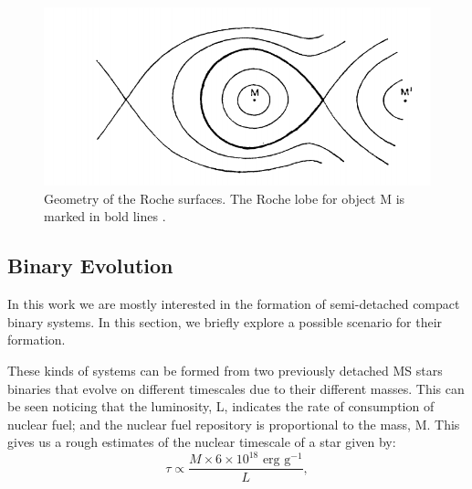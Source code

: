 \begin{figure}[]
        \centering
\includegraphics[scale=.3]{assets/images/kopalroche.png}
\caption[Geometry of the Roche surfaces]{Geometry of the Roche surfaces. The Roche lobe for object M is marked in bold lines \citep{kopal_close_1959}.}
\label{fig:roche1}
\end{figure}


\subsection{Binary Evolution}

In this work we are mostly interested in the formation of semi-detached compact binary systems. In this section, we briefly explore a possible scenario for their formation. 

These kinds of systems can be formed from two previously detached MS stars binaries that evolve on different timescales due to their different masses. This can be seen noticing that the luminosity, L, indicates the rate of consumption of nuclear fuel; and the nuclear fuel repository is proportional to the mass, M. This gives us a rough estimates of the nuclear timescale of a star given by: \\ 

\begin{equation}
        \tau \propto \frac{ M \times 6 \times 10^{18} \text{ erg g}^{-1}}{L},
\end{equation}


